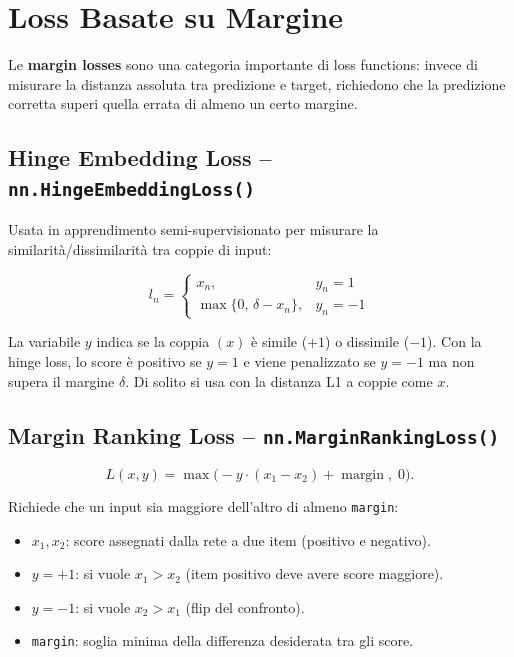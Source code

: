 \section{Loss Basate su Margine}
\label{sec:margin-losses}

Le \textbf{margin losses} sono una categoria importante di loss functions: invece
di misurare la distanza assoluta tra predizione e target, richiedono che la
predizione corretta superi quella errata di almeno un certo margine.

\subsection{Hinge Embedding Loss -- \texttt{nn.HingeEmbeddingLoss()}}
\label{subsec:hinge-embedding}

Usata in apprendimento semi-supervisionato per misurare la similarità/dissimilarità
tra coppie di input:

\begin{equation}
  l_n =
  \begin{cases}
    x_n,                        & y_n = 1  \\
    \max\{0,\, \delta - x_n\},  & y_n = -1
  \end{cases}
\end{equation}

La variabile $y$ indica se la coppia $(x)$ è simile ($+1$) o dissimile ($-1$).
Con la hinge loss, lo score è positivo se $y=1$ e viene penalizzato se $y=-1$
ma non supera il margine $\delta$.
Di solito si usa con la distanza L1 a coppie come $x$.

\subsection{Margin Ranking Loss -- \texttt{nn.MarginRankingLoss()}}
\label{subsec:margin-ranking}

\begin{equation}
  L(x, y) = \max\bigl(-y \cdot (x_1 - x_2) + \operatorname{margin},\; 0\bigr).
\end{equation}

Richiede che un input sia maggiore dell'altro di almeno \texttt{margin}:
\begin{itemize}
  \item $x_1, x_2$: score assegnati dalla rete a due item (positivo e negativo).
  \item $y = +1$: si vuole $x_1 > x_2$ (item positivo deve avere score maggiore).
  \item $y = -1$: si vuole $x_2 > x_1$ (flip del confronto).
  \item \texttt{margin}: soglia minima della differenza desiderata tra gli score.
\end{itemize}

